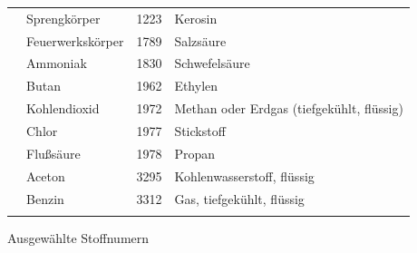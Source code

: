 \documentclass[
ngerman,
paper=a4,
asymmetric,
fontsize=9pt,
draft=false,
openany,
numbers=noenddot,
bibtotocnumbered,
footnotes=multiple,
toc=flat,
]{scrbook}
\begin{document}
{}
{}
{
\begin{tabulary}{\linewidth}{cLcL}
\toprule{} & Sprengkörper & 1223 & Kerosin
\\ & Feuerwerkskörper & 1789 & Salzsäure
\\ & Ammoniak & 1830 & Schwefelsäure
\\ & Butan & 1962 & Ethylen
\\ & Kohlendioxid & 1972 & Methan oder Erdgas (tiefgekühlt, flüssig)
\\ & Chlor & 1977 & Stickstoff
\\ & Flußsäure & 1978 & Propan
\\ & Aceton & 3295 & Kohlenwasserstoff, flüssig
\\ & Benzin & 3312 & Gas, tiefgekühlt, flüssig
\\\addlinespace\bottomrule
\end{tabulary}
}
{Ausgewählte Stoffnumern}
{}
\end{document}
